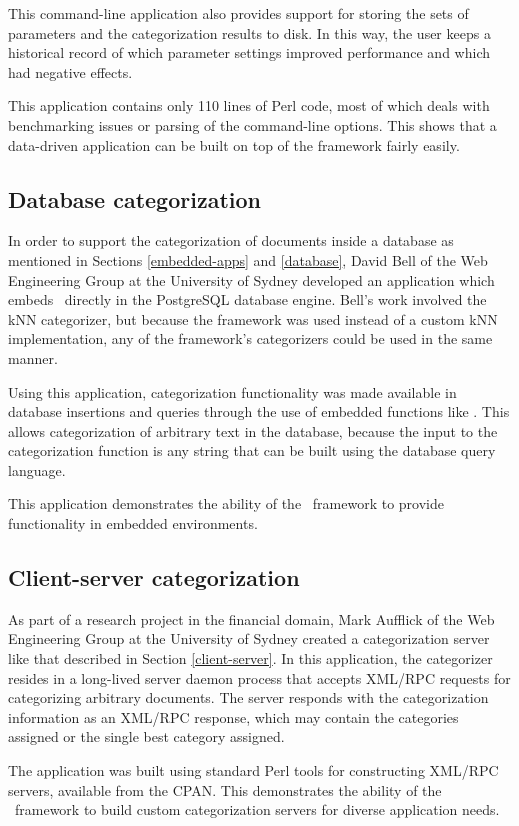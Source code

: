This command-line application also provides support for storing the
sets of parameters and the categorization results to disk.  In this
way, the user keeps a historical record of which parameter settings
improved performance and which had negative effects.

This application contains only 110 lines of Perl code, most of which
deals with benchmarking issues or parsing of the command-line
options.  This shows that a data-driven application can be built on
top of the framework fairly easily.

\subsection{Database categorization}

In order to support the categorization of documents inside a database
as mentioned in Sections \ref{embedded-apps} and \ref{database}, David
Bell of the Web Engineering Group at the University of Sydney
developed an application which embeds \aicat\ directly in the
PostgreSQL database engine.  Bell's work involved the kNN categorizer,
but because the framework was used instead of a custom kNN
implementation, any of the framework's categorizers could be used in
the same manner.

Using this application, categorization functionality was made
available in database insertions and queries through the use of
embedded functions like .  This allows
categorization of arbitrary text in the database, because the input to
the categorization function is any string that can be built using the
database query language.

This application demonstrates the ability of the \aicat\ framework to
provide functionality in embedded environments.

\subsection{Client-server categorization}

As part of a research project in the financial domain, Mark Aufflick
of the Web Engineering Group at the University of Sydney created a
categorization server like that described in Section
\ref{client-server}.  In this application, the categorizer resides in
a long-lived server daemon process that accepts XML/RPC requests for
categorizing arbitrary documents.  The server responds with the
categorization information as an XML/RPC response, which may contain
the categories assigned or the single best category assigned.

The application was built using standard Perl tools for constructing
XML/RPC servers, available from the CPAN.  This demonstrates the
ability of the \aicat\ framework to build custom categorization
servers for diverse application needs.
